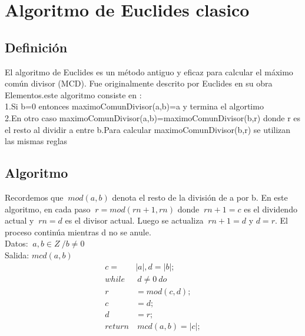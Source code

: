\chapter{Algoritmo de Euclides clasico}

\section{Definici\'on}
El algoritmo de Euclides es un m\'etodo antiguo y eficaz para calcular el m\'aximo com\'un divisor (MCD). Fue originalmente descrito por Euclides en su obra Elementos.este algoritmo consiste en : \\
1.Si b=0 entonces maximoComunDivisor(a,b)=a y termina el algortimo\\
2.En otro caso maximoComunDivisor(a,b)=maximoComunDivisor(b,r) donde r es el resto al dividir a entre b.Para calcular maximoComunDivisor(b,r) se utilizan las mismas reglas \\

\section{Algoritmo}
Recordemos que $\:mod(a, b)$ denota el resto de la división de a por b. En este algoritmo, en cada paso $\:r = mod (rn+1, rn)$ donde $\:rn+1 = c$ es el dividendo actual y $\:rn = d$ es el divisor actual.
Luego se actualiza $\:rn+1 = d$ y $d = r$. El proceso continúa mientras d no se anule.\\
Datos: $\:a,b \in Z\:/b\neq0$\\
Salida: $mcd(a,b)$\\
\begin{equation}
 \begin{align}
  c=&|a|,d=|b|;\\
  while&\:d\neq0\:do\\
  r&=mod(c,d);\\
  c&=d;\\
  d&=r;\\
  return&\:mcd(a,b)=|c|;
 \end{align}
\end{equation}
